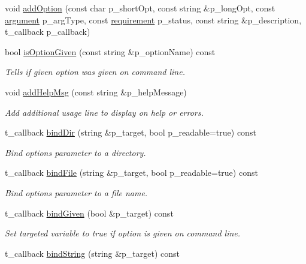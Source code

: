 \begin{DoxyCompactItemize}
void \hyperlink{classxtd_1_1Application_a7cea42a03984ceed3bae129ff9e1ef54}{add\+Option} (const char p\+\_\+short\+Opt, const string \&p\+\_\+long\+Opt, const \hyperlink{classxtd_1_1Application_a672c075ed901e463609077d571a714c7}{argument} p\+\_\+arg\+Type, const \hyperlink{classxtd_1_1Application_a49c0397e9fd22067e3a536443a17fe24}{requirement} p\+\_\+status, const string \&p\+\_\+description, t\+\_\+callback p\+\_\+callback)
\item 
bool \hyperlink{classxtd_1_1Application_a4aca412c4a0bcd761e28b0350bd71578}{is\+Option\+Given} (const string \&p\+\_\+option\+Name) const 
\begin{DoxyCompactList}\small\item\em Tells if given option was given on command line. \end{DoxyCompactList}\item 
void \hyperlink{classxtd_1_1Application_abdfaafd220104a063c344a4f7e126ec0}{add\+Help\+Msg} (const string \&p\+\_\+help\+Message)
\begin{DoxyCompactList}\small\item\em Add additional usage line to display on help or errors. \end{DoxyCompactList}\item 
t\+\_\+callback \hyperlink{classxtd_1_1Application_a2b491ba745bbd3b2d01d9e623c0aff60}{bind\+Dir} (string \&p\+\_\+target, bool p\+\_\+readable=true) const 
\begin{DoxyCompactList}\small\item\em Bind option\textquotesingle{}s parameter to a directory. \end{DoxyCompactList}\item 
t\+\_\+callback \hyperlink{classxtd_1_1Application_ab10f6dde0bf4034dff7eafe8a45c2029}{bind\+File} (string \&p\+\_\+target, bool p\+\_\+readable=true) const 
\begin{DoxyCompactList}\small\item\em Bind option\textquotesingle{}s parameter to a file name. \end{DoxyCompactList}\item 
t\+\_\+callback \hyperlink{classxtd_1_1Application_a59b986c85c2e1d9473f73df10425dfcf}{bind\+Given} (bool \&p\+\_\+target) const 
\begin{DoxyCompactList}\small\item\em Set targeted variable to true if option is given on command line. \end{DoxyCompactList}\item 
t\+\_\+callback \hyperlink{classxtd_1_1Application_a36a351db3830e2e894a39fbd42842280}{bind\+String} (string \&p\+\_\+target) const 

\end{DoxyCompactItemize}
